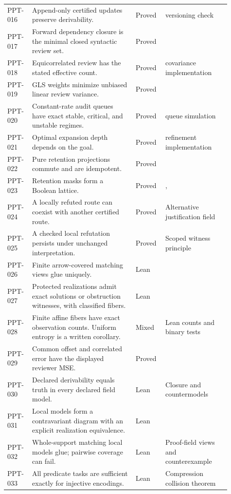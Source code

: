 \documentclass[11pt,oneside]{article}
\theoremstyle{definition}
\theoremstyle{remark}
\begin{document}
\begin{longtable}{@{}L{0.09\linewidth}L{0.43\linewidth}L{0.12\linewidth}L{0.27\linewidth}@{}}
PPT-016 & Append-only certified updates preserve derivability. & Proved & versioning check\\
PPT-017 & Forward dependency closure is the minimal closed syntactic review set. & Proved & \\
PPT-018 & Equicorrelated review has the stated effective count. & Proved & covariance implementation\\
PPT-019 & GLS weights minimize unbiased linear review variance. & Proved & \\
PPT-020 & Constant-rate audit queues have exact stable, critical, and unstable regimes. & Proved & queue simulation\\
PPT-021 & Optimal expansion depth depends on the goal. & Proved & refinement implementation\\
PPT-022 & Pure retention projections commute and are idempotent. & Proved & \\
PPT-023 & Retention masks form a Boolean lattice. & Proved & , \\
PPT-024 & A locally refuted route can coexist with another certified route. & Proved & Alternative justification field\\
PPT-025 & A checked local refutation persists under unchanged interpretation. & Proved & Scoped witness principle\\
PPT-026 & Finite arrow-covered matching views glue uniquely. & Lean & \\
PPT-027 & Protected realizations admit exact solutions or obstruction witnesses, with classified fibers. & Lean & \\
PPT-028 & Finite affine fibers have exact observation counts. Uniform entropy is a written corollary. & Mixed & Lean counts and binary tests\\
PPT-029 & Common offset and correlated error have the displayed reviewer MSE. & Proved & \\
PPT-030 & Declared derivability equals truth in every declared field model. & Lean & Closure and countermodels\\
PPT-031 & Local models form a contravariant diagram with an explicit realization equivalence. & Lean & \\
PPT-032 & Whole-support matching local models glue; pairwise coverage can fail. & Lean & Proof-field views and counterexample\\
PPT-033 & All predicate tasks are sufficient exactly for injective encodings. & Lean & Compression collision theorem\\
\bottomrule
\end{longtable}
\end{document}
